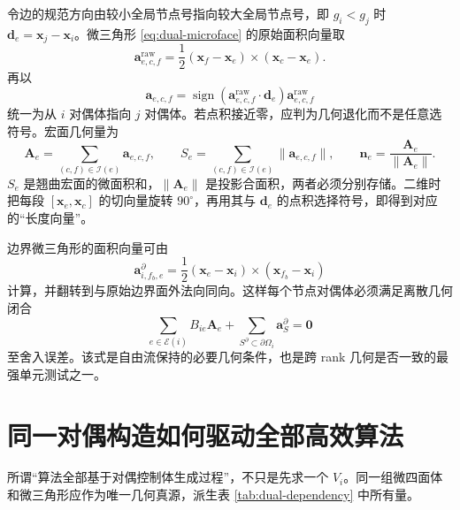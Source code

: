 \documentclass[UTF8,a4paper,11pt,openany]{ctexrep}
\numberwithin{equation}{chapter}
\begin{document}
令边的规范方向由较小全局节点号指向较大全局节点号，即 $g_i<g_j$ 时 $\bm d_e=\bm x_j-\bm x_i$。微三角形 \cref{eq:dual-microface} 的原始面积向量取
\begin{equation}
  \bm a^{\mathrm{raw}}_{e,c,f}
  =\frac12(\bm x_f-\bm x_e)\times(\bm x_c-\bm x_e).
\end{equation}
再以
\begin{equation}
  \bm a_{e,c,f}
  =\operatorname{sign}\!\left(
     \bm a^{\mathrm{raw}}_{e,c,f}\cdot\bm d_e
   \right)\bm a^{\mathrm{raw}}_{e,c,f}
  \label{eq:orient-microface}
\end{equation}
统一为从 $i$ 对偶体指向 $j$ 对偶体。若点积接近零，应判为几何退化而不是任意选符号。宏面几何量为
\begin{equation}
  \bm A_e=\sum_{(c,f)\in\mathcal I(e)}\bm a_{e,c,f},
  \qquad
  S_e=\sum_{(c,f)\in\mathcal I(e)}\|\bm a_{e,c,f}\|,
  \qquad
  \bm n_e=\frac{\bm A_e}{\|\bm A_e\|}.
  \label{eq:dual-macro-geometry}
\end{equation}
$S_e$ 是翘曲宏面的微面积和，$\|\bm A_e\|$ 是投影合面积，两者必须分别存储。二维时把每段 $[\bm x_e,\bm x_c]$ 的切向量旋转 $90^\circ$，再用其与 $\bm d_e$ 的点积选择符号，即得到对应的“长度向量”。

边界微三角形的面积向量可由
\begin{equation}
  \bm a^{\partial}_{i,f_b,e}
  =\frac12(\bm x_e-\bm x_i)\times(\bm x_{f_b}-\bm x_i)
\end{equation}
计算，并翻转到与原始边界面外法向同向。这样每个节点对偶体必须满足离散几何闭合
\begin{equation}
  \sum_{e\in\mathcal E(i)}B_{ie}\bm A_e
  +\sum_{S^\partial\subset\partial\Omega_i}\bm a^\partial_S
  =\bm0
  \label{eq:dual-vector-closure}
\end{equation}
至舍入误差。该式是自由流保持的必要几何条件，也是跨 rank 几何是否一致的最强单元测试之一。

\section{同一对偶构造如何驱动全部高效算法}

所谓“算法全部基于对偶控制体生成过程”，不只是先求一个 $V_i$。同一组微四面体和微三角形应作为唯一几何真源，派生表 \ref{tab:dual-dependency} 中所有量。
\end{document}
